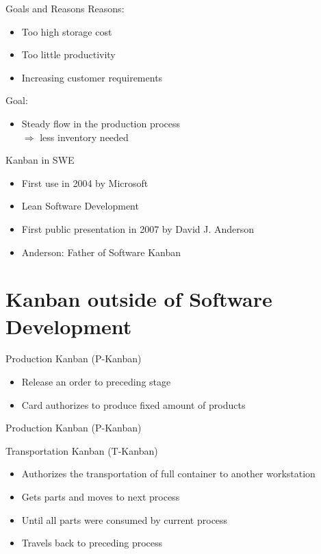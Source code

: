 \documentclass[12pt]{beamer}
\newcommand{\bi}{\begin{itemize}}
\newcommand{\ei}{\end{itemize}}
\begin{document}
		\begin{frame}{\secname}{Goals and Reasons}
			Reasons:
			\bi
				\item Too high storage cost
				\item Too little productivity
				\item Increasing customer requirements
			\ei
			
			\vspace{0.5cm}
			\pause
			
			Goal:
			\bi
				\item Steady flow in the production process \\ $\Rightarrow$ less inventory needed
			\ei
		\end{frame}
		
		\begin{frame}{\secname}{Kanban in SWE}
			\bi
				\item First use in 2004 by Microsoft
				\item Lean Software Development
				\item First public presentation in 2007 by David J. Anderson
				\item Anderson: Father of Software Kanban
			\ei
		\end{frame}
		
	\section{Kanban outside of Software Development}
	
		\begin{frame}{\secname}{Production Kanban (P-Kanban)}
			\bi
				\item Release an order to preceding stage
				\item Card authorizes to produce fixed amount of products
			\ei
		\end{frame}
		
		\begin{frame}{\secname}{Production Kanban (P-Kanban)}
		\end{frame}
		
		\begin{frame}{\secname}{Transportation Kanban (T-Kanban)}
			\bi
				\item Authorizes the transportation of full container to another workstation
				\item Gets parts and moves to next process
				\item Until all parts were consumed by current process
				\item Travels back to preceding process
			\ei
		\end{frame}
		
\end{document}
